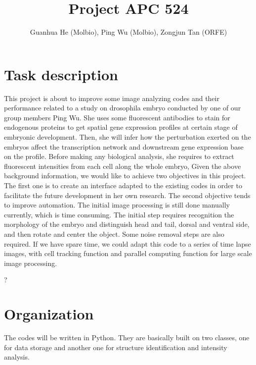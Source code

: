 \documentclass[a4paper,12pt]{article}
\title{Project APC 524}
\author{Guanhua He (Molbio), Ping Wu (Molbio), Zongjun Tan (ORFE)}
\theoremstyle{remark}
\numberwithin{equation}{section}
\begin{document}
 \maketitle
	
	
	\section{Task description}
	
This project is about to improve some image analyzing codes and their performance related to a study on drosophila embryo conducted by one of our group
members Ping Wu. She uses some fluorescent antibodies to stain for endogenous proteins to get spatial gene expression profiles at certain stage of embryonic development. Then, she will infer how the perturbation exerted on the embryos affect the transcription network and downstream gene expression base on the profile. Before making any biological analysis, she requires to extract fluorescent intensities from each cell along the whole embryo,
Given the above background information, we would like to achieve two objectives in this project. The first one is to create an interface adapted to the existing
codes in order to facilitate the future development in her own research. The second objective tends to improve automation. The initial image processing is still done manually currently, which is time consuming. The initial step requires recognition the morphology of the embryo and distinguish head and tail, dorsal and ventral side, and then rotate and center the object. Some noise removal steps are also required. If we have spare time, we could adapt this code to a series of time lapse images, with cell tracking function and parallel computing function for large scale image processing.

?	%
	
	\section{Organization}

	The codes will be written in Python. They are basically built on two classes, one for data storage and another one for structure identification and intensity analysis. 
	
\end{document}
